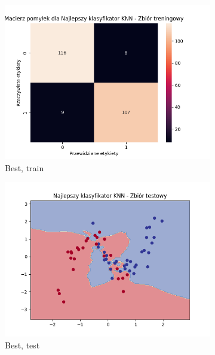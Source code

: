 \documentclass[12pt]{article}
\newcommand*{\subfigwidth}{0.24\textwidth}
\begin{document}
\begin{figure}[H]
\begin{subfigure}[t]{\subfigwidth}
        \includegraphics[width=\linewidth]{img/exp_2/knn/2_3/best/train_matrix.png}
        \caption{Best, train}
    \end{subfigure}
    \hfill
    \begin{subfigure}[t]{\subfigwidth}
        \includegraphics[width=\linewidth]{img/exp_2/knn/2_3/best/test_boundary.png}
        \caption{Best, test}
    \end{subfigure}
    \hfill
    \begin{subfigure}[t]{\subfigwidth}

\end{subfigure}
\end{figure}
\end{document}
